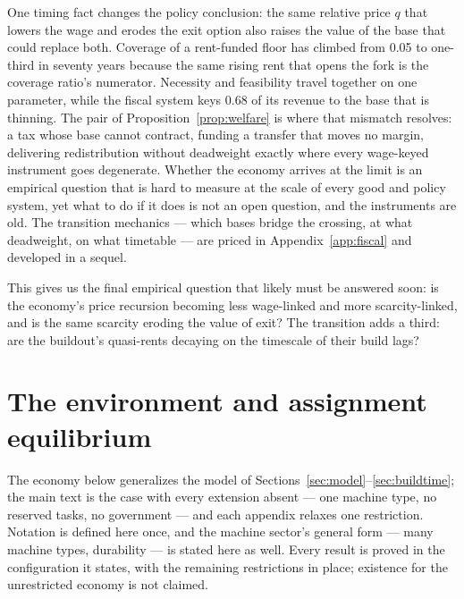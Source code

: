 \documentclass[12pt]{article}
\theoremstyle{plain}
\begin{document}
One timing fact changes the policy conclusion: the same relative price $q$ that lowers the wage and erodes the exit option also raises the value of the base that could replace both. Coverage of a rent-funded floor has climbed from 0.05 to one-third in seventy years because the same rising rent that opens the fork is the coverage ratio's numerator. Necessity and feasibility travel together on one parameter, while the fiscal system keys 0.68 of its revenue to the base that is thinning. The pair of Proposition~\ref{prop:welfare} is where that mismatch resolves: a tax whose base cannot contract, funding a transfer that moves no margin, delivering redistribution without deadweight exactly where every wage-keyed instrument goes degenerate. Whether the economy arrives at the limit is an empirical question that is hard to measure at the scale of every good and policy system, yet what to do if it does is not an open question, and the instruments are old. The transition mechanics --- which bases bridge the crossing, at what deadweight, on what timetable --- are priced in Appendix~\ref{app:fiscal} and developed in a sequel.

This gives us the final empirical question that likely must be answered soon: is the economy's price recursion becoming less wage-linked and more scarcity-linked, and is the same scarcity eroding the value of exit? The transition adds a third: are the buildout's quasi-rents decaying on the timescale of their build lags?

\appendix
{}

\section{The environment and assignment equilibrium}\label{app:environment}

The economy below generalizes the model of Sections~\ref{sec:model}--\ref{sec:buildtime}; the main text is the case with every extension absent --- one machine type, no reserved tasks, no government --- and each appendix relaxes one restriction. Notation is defined here once, and the machine sector's general form --- many machine types, durability --- is stated here as well. Every result is proved in the configuration it states, with the remaining restrictions in place; existence for the unrestricted economy is not claimed.
\end{document}
